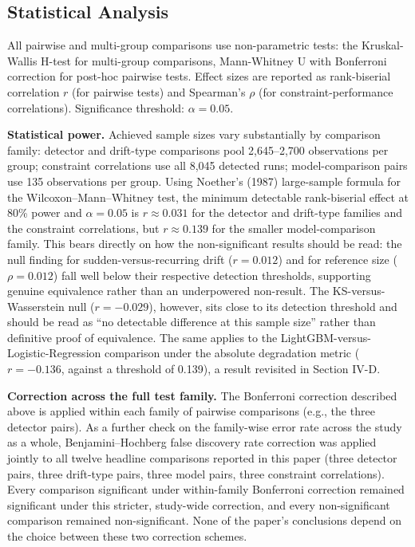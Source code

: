 \documentclass[conference]{IEEEtran}
\begin{document}
\subsection{Statistical Analysis}

All pairwise and multi-group comparisons use non-parametric tests: the Kruskal-Wallis H-test for multi-group comparisons, Mann-Whitney U with Bonferroni correction for post-hoc pairwise tests. Effect sizes are reported as rank-biserial correlation $r$ (for pairwise tests) and Spearman's $\rho$ (for constraint-performance correlations). Significance threshold: $\alpha = 0.05$.

\textbf{Statistical power.} Achieved sample sizes vary substantially by comparison family: detector and drift-type comparisons pool 2,645--2,700 observations per group; constraint correlations use all 8,045 detected runs; model-comparison pairs use 135 observations per group. Using Noether's (1987) large-sample formula for the Wilcoxon--Mann--Whitney test, the minimum detectable rank-biserial effect at 80\% power and $\alpha = 0.05$ is $r \approx 0.031$ for the detector and drift-type families and the constraint correlations, but $r \approx 0.139$ for the smaller model-comparison family. This bears directly on how the non-significant results should be read: the null finding for sudden-versus-recurring drift ($r = 0.012$) and for reference size ($\rho = 0.012$) fall well below their respective detection thresholds, supporting genuine equivalence rather than an underpowered non-result. The KS-versus-Wasserstein null ($r = -0.029$), however, sits close to its detection threshold and should be read as ``no detectable difference at this sample size'' rather than definitive proof of equivalence. The same applies to the LightGBM-versus-Logistic-Regression comparison under the absolute degradation metric ($r = -0.136$, against a threshold of 0.139), a result revisited in Section IV-D.

\textbf{Correction across the full test family.} The Bonferroni correction described above is applied within each family of pairwise comparisons (e.g., the three detector pairs). As a further check on the family-wise error rate across the study as a whole, Benjamini--Hochberg false discovery rate correction was applied jointly to all twelve headline comparisons reported in this paper (three detector pairs, three drift-type pairs, three model pairs, three constraint correlations). Every comparison significant under within-family Bonferroni correction remained significant under this stricter, study-wide correction, and every non-significant comparison remained non-significant. None of the paper's conclusions depend on the choice between these two correction schemes.
\end{document}
